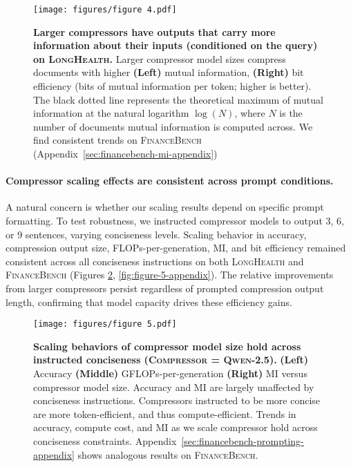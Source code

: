 \documentclass{article} %
\begin{document}
\begin{figure}[h!]
    \centering
    \texttt{[image: figures/figure 4.pdf]}
    \caption{\textbf{Larger compressors have outputs that carry more information about their inputs (conditioned on the query) on \textsc{LongHealth}.} Larger compressor model sizes compress documents with higher \textbf{(Left)} mutual information, \textbf{(Right)} bit efficiency (bits of mutual information per token; higher is better). The black dotted line represents the theoretical maximum of mutual information at the natural logarithm $\log(N)$, where $N$ is the number of documents mutual information is computed across. We find consistent trends on \textsc{FinanceBench} (Appendix~\ref{sec:financebench-mi-appendix})}
    \label{fig:figure-4-mi}
\end{figure}

\paragraph*{Compressor scaling effects are consistent across prompt conditions.}
A natural concern is whether our scaling results depend on specific prompt formatting. To test robustness, we instructed compressor models to output 3, 6, or 9 sentences, varying conciseness levels. Scaling behavior in accuracy, compression output size, FLOPs-per-generation, MI, and bit efficiency remained consistent across all conciseness instructions on both \textsc{LongHealth} and \textsc{FinanceBench} (Figures \ref{fig:figure-5-prompting}, \ref{fig:figure-5-appendix}). The relative improvements from larger compressors persist regardless of prompted compression output length, confirming that model capacity drives these efficiency gains.

\begin{figure}[ht]
    \centering
    \texttt{[image: figures/figure 5.pdf]}
    \caption{\textbf{Scaling behaviors of compressor model size hold across instructed conciseness (\textsc{Compressor = Qwen-2.5}).}
    \textbf{(Left)} Accuracy \textbf{(Middle)} GFLOPs-per-generation \textbf{(Right)} MI versus compressor model size. 
    Accuracy and MI are largely unaffected by conciseness instructions. Compressors instructed to be more concise are more token-efficient, and thus compute-efficient. Trends in accuracy, compute cost, and MI as we scale compressor hold across conciseness constraints. Appendix~\ref{sec:financebench-prompting-appendix} shows analogous results on \textsc{FinanceBench}.}
    \label{fig:figure-5-prompting}
\end{figure}
\end{document}

